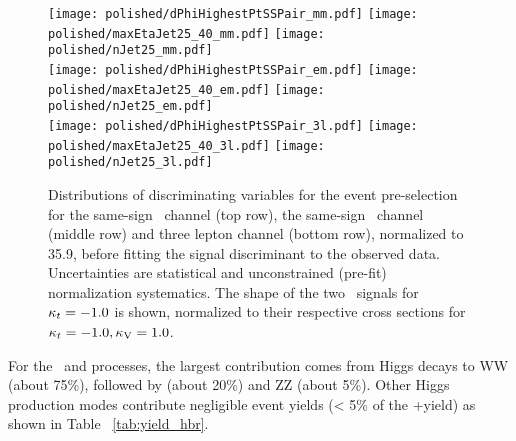 \begin{figure}[!htb]
\centering
        \texttt{[image: polished/dPhiHighestPtSSPair\_mm.pdf]}
        \texttt{[image: polished/maxEtaJet25\_40\_mm.pdf]}
        \texttt{[image: polished/nJet25\_mm.pdf]} \\
        \texttt{[image: polished/dPhiHighestPtSSPair\_em.pdf]}
        \texttt{[image: polished/maxEtaJet25\_40\_em.pdf]}
        \texttt{[image: polished/nJet25\_em.pdf]} \\
        \texttt{[image: polished/dPhiHighestPtSSPair\_3l.pdf]}
        \texttt{[image: polished/maxEtaJet25\_40\_3l.pdf]}
        \texttt{[image: polished/nJet25\_3l.pdf]} 
\caption{Distributions of discriminating variables for the event pre-selection for the same-sign \mumu\ channel (top row), the same-sign \emu\ channel (middle row) and three lepton channel (bottom row), normalized to 35.9\fbinv, before fitting the signal discriminant to the observed data. Uncertainties are statistical and unconstrained (pre-fit) normalization systematics. The shape of the two \tH\ signals for $\kappa_t=-1.0$ is shown, normalized to their respective cross sections for $\kappa_t=-1.0, \kappa_\text{V}=1.0$.}
\label{fig:input_vars_presel}
\end{figure}

For the \tH\ and \ttH processes, the largest contribution comes from Higgs decays to WW (about 75\%), followed
by \tautau (about 20\%) and ZZ (about 5\%). Other Higgs production modes contribute negligible event yields (< 5\% of the \tH +\ttH yield) as shown in Table ~\ref{tab:yield_hbr}.

